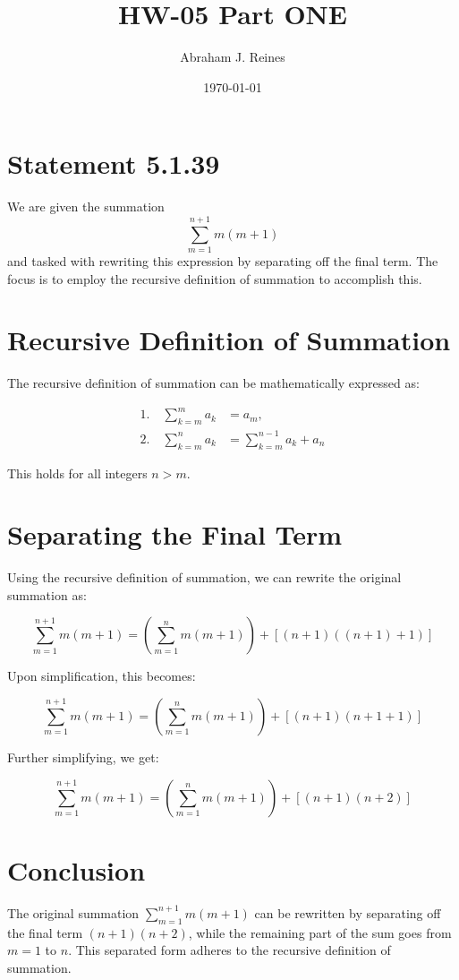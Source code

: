 \documentclass[12pt]{article}
\begin{document}
\doublespacing %

\title{HW-05 Part ONE}
\author{Abraham J. Reines}
\date{\today}
\maketitle

\section*{Statement 5.1.39}
We are given the summation
\[
\sum_{m=1}^{n+1} m(m+1)
\]
and tasked with rewriting this expression by separating off the final term. The focus is to employ the recursive definition of summation to accomplish this.

\section{Recursive Definition of Summation}
The recursive definition of summation can be mathematically expressed as:

\begin{align*}
    1. \quad \sum_{k=m}^{m} a_k &= a_m, \\
    2. \quad \sum_{k=m}^{n} a_k &= \sum_{k=m}^{n-1} a_k + a_n
\end{align*}

This holds for all integers \( n > m \).

\newpage
  \section{Separating the Final Term}
Using the recursive definition of summation, we can rewrite the original summation as:

\[
\sum_{m=1}^{n+1} m(m+1) = \left( \sum_{m=1}^{n} m(m+1) \right) + [(n+1)((n+1)+1)]
\]

Upon simplification, this becomes:

\[
\sum_{m=1}^{n+1} m(m+1) = \left( \sum_{m=1}^{n} m(m+1) \right) + [(n+1)(n+1+1)]
\]

Further simplifying, we get:

\[
\sum_{m=1}^{n+1} m(m+1) = \left( \sum_{m=1}^{n} m(m+1) \right) + [(n+1)(n+2)]
\]

\section{Conclusion}
The original summation \(\sum_{m=1}^{n+1} m(m+1)\) can be rewritten by separating off the final term \( (n+1)(n+2) \), while the remaining part of the sum goes from \( m = 1 \) to \( n \). This separated form adheres to the recursive definition of summation.
\end{document}
